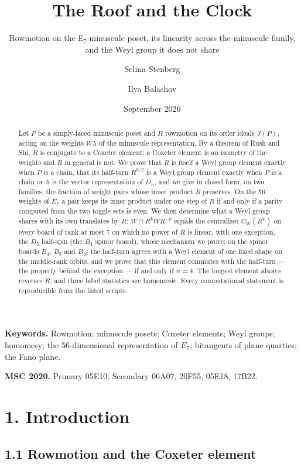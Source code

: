 \documentclass[
]{article}
\title{The Roof and the Clock}
\subtitle{Rowmotion on the E₇ minuscule poset, its linearity across the
minuscule family, and the Weyl group it does not share}
\author{Selina Stenberg \and Ilya Balashov}
\date{September 2026}
\begin{document}
\maketitle
\begin{abstract}
Let \(P\) be a simply-laced minuscule poset and \(R\) rowmotion on its
order ideals \(J(P)\), acting on the weights \(W\lambda\) of the
minuscule representation. By a theorem of Rush and Shi, \(R\) is
conjugate to a Coxeter element; a Coxeter element is an isometry of the
weights and \(R\) in general is not. We prove that \(R\) is itself a
Weyl group element exactly when \(P\) is a chain, that its half-turn
\(R^{h/2}\) is a Weyl group element exactly when \(P\) is a chain or
\(\lambda\) is the vector representation of \(D_n\), and we give in
closed form, on two families, the fraction of weight pairs whose inner
product \(R\) preserves. On the 56 weights of \(E_7\) a pair keeps its
inner product under one step of \(R\) if and only if a parity computed
from the two toggle sets is even. We then determine what a Weyl group
shares with its own translates by \(R\): \(W \cap R^kWR^{-k}\) equals
the centralizer \(C_W(R^k)\) on every board of rank at most 7 on which
no power of \(R\) is linear, with one exception, the \(D_5\) half-spin
(the \(B_4\) spinor board), whose mechanism we prove; on the spinor
boards \(B_4\), \(B_8\) and \(B_{16}\) the half-turn agrees with a Weyl
element of one fixed shape on the middle-rank orbits, and we prove that
this element commutes with the half-turn --- the property behind the
exception --- if and only if \(n = 4\). The longest element always
reverses \(R\), and three label statistics are homomesic. Every
computational statement is reproducible from the listed scripts.
\end{abstract}

\textbf{Keywords.} Rowmotion; minuscule posets; Coxeter elements; Weyl
groups; homomesy; the 56-dimensional representation of \(E_7\);
bitangents of plane quartics; the Fano plane.

\textbf{MSC 2020.} Primary 05E10; Secondary 06A07, 20F55, 05E18, 17B22.

\section{1. Introduction}\label{introduction}

\subsection{1.1 Rowmotion and the Coxeter
element}\label{rowmotion-and-the-coxeter-element}
\end{document}
